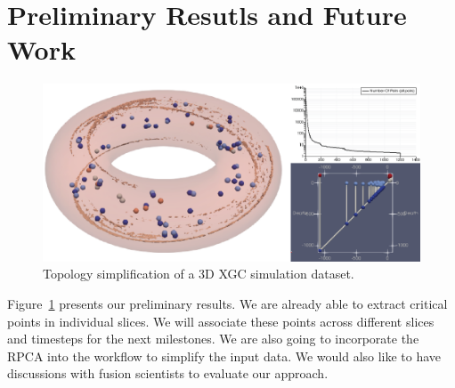 \section{Preliminary Resutls and Future Work}

\begin{figure}[!h]
  \centering
  \includegraphics[width=\linewidth]{Figs/simplification3D}
  \caption{Topology simplification of a 3D XGC simulation dataset.}
  \label{fig:results}
\end{figure}



Figure~\ref{fig:results} presents our preliminary results.  We are already able to extract critical points in individual slices.  We will associate these points across different slices and timesteps for the next milestones.  We are also going to incorporate the RPCA into the workflow to simplify the input data.  We would also like to have discussions with fusion scientists to evaluate our approach.  